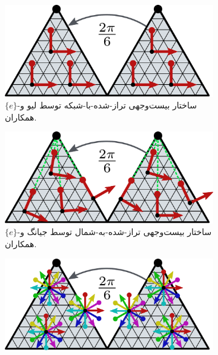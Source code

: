 \begin{figure}
    \centering
    \begin{subfigure}[b]{0.31\textwidth}
        \centering
        \includegraphics[width=1.\textwidth]{figures/icosahedron_G_structure_1.pdf}
        \vspace*{-6pt}
        \captionsetup{width=.9\textwidth}
        \caption{\small
            $\{e\}$-ساختار بیست‌وجهی تراز-شده-با-شبکه توسط لیو و همکاران\cite{liu2018icoAltAz}.
        }
        \label{fig:G_structure_ico_1}
    \end{subfigure}
    \hfill
    \begin{subfigure}[b]{0.31\textwidth}
        \centering
        \includegraphics[width=1.\textwidth]{figures/icosahedron_G_structure_2.pdf}
        \vspace*{-6pt}
        \captionsetup{width=.9\textwidth}
        \caption{\small
            $\{e\}$-ساختار بیست‌وجهی تراز-شده-به-شمال توسط جیانگ و همکاران\cite{zhang2019orientation}.
        }
        \label{fig:G_structure_ico_2}
    \end{subfigure}
    \hfill
    \begin{subfigure}[b]{0.31\textwidth}
        \centering
        \includegraphics[width=1.\textwidth]{figures/icosahedron_G_structure_3.pdf}

\end{subfigure}
\end{figure}
